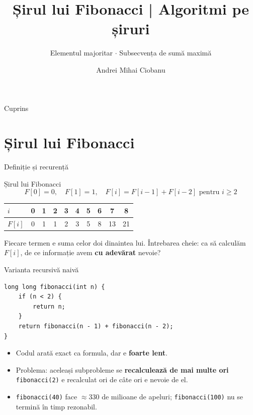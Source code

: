 ﻿\documentclass{beamer}
\title{Șirul lui Fibonacci | Algoritmi pe șiruri}
\subtitle{Elementul majoritar $\cdot$ Subsecvența de sumă maximă}
\author{Andrei Mihai Ciobanu}
\institute{Algolymp Summer School}
\date{}
\begin{document}
\begin{frame}[shrink]
  \titlepage
\end{frame}

\begin{frame}{Cuprins}
  \tableofcontents
\end{frame}

\section{Șirul lui Fibonacci}

\begin{frame}{Definiție și recurență}
  \begin{block}{Șirul lui Fibonacci}
    \[
      F[0] = 0, \quad F[1] = 1, \quad F[i] = F[i-1] + F[i-2] \text{ pentru } i \geq 2
    \]
  \end{block}

  \smallskip
  \begin{center}
  \begin{tabular}{lccccccccc}
    \toprule
    $i$    & 0 & 1 & 2 & 3 & 4 & 5 & 6 & 7 & 8 \\
    \midrule
    $F[i]$ & 0 & 1 & 1 & 2 & 3 & 5 & 8 & 13 & 21 \\
    \bottomrule
  \end{tabular}
  \end{center}

  \smallskip
  Fiecare termen e suma celor doi dinaintea lui. Întrebarea cheie: ca să calculăm $F[i]$, de ce informație avem \textbf{cu adevărat} nevoie?
\end{frame}

\begin{frame}[fragile]{Varianta recursivă naivă}
  \begin{lstlisting}
long long fibonacci(int n) {
    if (n < 2) {
        return n;
    }
    return fibonacci(n - 1) + fibonacci(n - 2);
}
  \end{lstlisting}
  \begin{itemize}
    \item Codul arată exact ca formula, dar e \textbf{foarte lent}.
    \item Problema: aceleași subprobleme se \textbf{recalculează de mai multe ori} \textemdash{} \lstinline|fibonacci(2)| e recalculat ori de câte ori e nevoie de el.
    \item \lstinline|fibonacci(40)| face $\approx 330$ de milioane de apeluri; \lstinline|fibonacci(100)| nu se termină în timp rezonabil.
  \end{itemize}
\end{frame}
\end{document}
